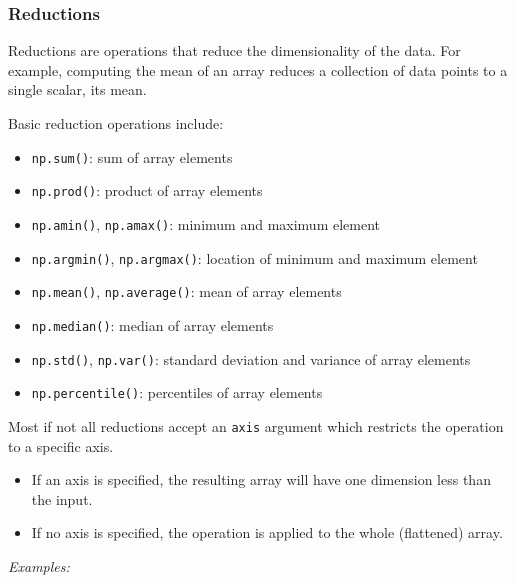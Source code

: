\documentclass[10pt]{scrartcl}
\providecommand{\tightlist}{%
      \setlength{\itemsep}{0pt}\setlength{\parskip}{0pt}}
\begin{document}
    \hypertarget{reductions}{%
\subsubsection{Reductions}\label{reductions}}

Reductions are operations that reduce the dimensionality of the data.
For example, computing the mean of an array reduces a collection of data
points to a single scalar, its mean.

Basic reduction operations include:

\begin{itemize}
\tightlist
\item
  \texttt{np.sum()}: sum of array elements
\item
  \texttt{np.prod()}: product of array elements
\item
  \texttt{np.amin()}, \texttt{np.amax()}: minimum and maximum element
\item
  \texttt{np.argmin()}, \texttt{np.argmax()}: location of minimum and
  maximum element
\item
  \texttt{np.mean()}, \texttt{np.average()}: mean of array elements
\item
  \texttt{np.median()}: median of array elements
\item
  \texttt{np.std()}, \texttt{np.var()}: standard deviation and variance
  of array elements
\item
  \texttt{np.percentile()}: percentiles of array elements
\end{itemize}

Most if not all reductions accept an \texttt{axis} argument which
restricts the operation to a specific axis.

\begin{itemize}
\tightlist
\item
  If an axis is specified, the resulting array will have one dimension
  less than the input.
\item
  If no axis is specified, the operation is applied to the whole
  (flattened) array.
\end{itemize}

\emph{Examples:}
\end{document}
